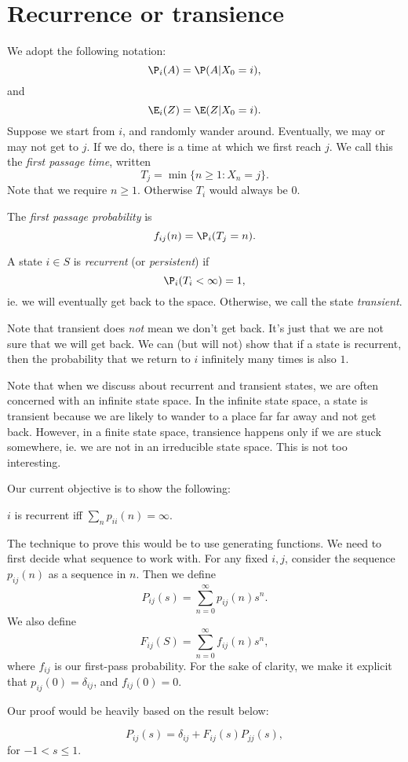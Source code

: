 \documentclass[a4paper]{article}
\begin{document}
\section{Recurrence or transience}
We adopt the following notation:
\[
  \P_i(A) = \P(A| X_0 = i),
\]
and
\[
  \E_i(Z) = \E(Z| X_0 = i).
\]
Suppose we start from $i$, and randomly wander around. Eventually, we may or may not get to $j$. If we do, there is a time at which we first reach $j$. We call this the \emph{first passage time}, written
\[
  T_j = \min\{n \geq 1: X_n = j\}.
\]
Note that we require $n \geq 1$. Otherwise $T_i$ would always be $0$.

The \emph{first passage probability} is
\[
  f_{ij}(n) = \P_i(T_j = n).
\]
\begin{defi}
  A state $i\in S$ is \emph{recurrent} (or \emph{persistent}) if
  \[
    \P_i (T_i < \infty) = 1,
  \]
  ie. we will eventually get back to the space. Otherwise, we call the state \emph{transient}.
\end{defi}
Note that transient does \emph{not} mean we don't get back. It's just that we are not sure that we will get back. We can (but will not) show that if a state is recurrent, then the probability that we return to $i$ infinitely many times is also $1$.

Note that when we discuss about recurrent and transient states, we are often concerned with an infinite state space. In the infinite state space, a state is transient because we are likely to wander to a place far far away and not get back. However, in a finite state space, transience happens only if we are stuck somewhere, ie. we are not in an irreducible state space. This is not too interesting.

Our current objective is to show the following:
\begin{thm}
  $i$ is recurrent iff $\sum_n p_{ii}(n) = \infty$.
\end{thm}
The technique to prove this would be to use generating functions. We need to first decide what sequence to work with. For any fixed $i, j$, consider the sequence $p_{ij}(n)$ as a sequence in $n$. Then we define
\[
  P_{ij}(s) = \sum_{n = 0}^\infty p_{ij}(n) s^n.
\]
We also define
\[
  F_{ij}(S) = \sum_{n = 0}^\infty f_{ij}(n) s^n,
\]
where $f_{ij}$ is our first-pass probability. For the sake of clarity, we make it explicit that $p_{ij}(0) = \delta_{ij}$, and $f_{ij}(0) = 0$.

Our proof would be heavily based on the result below:
\begin{thm}[]
  \[
    P_{ij}(s) = \delta_{ij} + F_{ij}(s)P_{jj}(s),
  \]
  for $-1 < s \leq 1$.
\end{thm}
\end{document}
